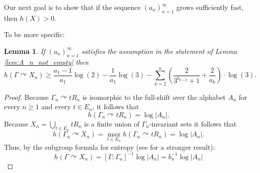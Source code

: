 \documentclass[oneside,english]{amsart}
\newtheorem{lem}[thm]{Lemma}
\theoremstyle{definition}
\newcommand{\act}[2]{{#1} \curvearrowright {#2}}
\begin{document}
Our next goal is to  show that if the sequence $(a_n)_{n=1}^\infty$ grows sufficiently fast, then $h(X)>0$.

To be more specific:

\begin{lem}\label{lem:h_X_n_lower_bound}
If $(a_n)_{n=1}^\infty$ satisfies the assumption in the statement of Lemma \ref{lem:A_n_not_empty} then
\begin{equation}\label{h_X_n_lower_bound}
 h(\act{\Gamma}{X_n})\ge \frac{a_1-1}{a_1}\log(2)- \frac{1}{a_1}\log(3) - \sum_{k=2}^n \left(\frac{2}{3^{b_{k-2}}+1}+\frac{2}{a_k}\right)\cdot \log(3).
\end{equation}
\end{lem}
\begin{proof}
Because $\act{\Gamma_n}{tR_n}$  is isomorphic to the full-shift over the alphabet $A_n$ for every $n \ge1 $ and every $t \in E_n$,
 it follows %
that
$$h(\act{\Gamma_n}{tR_n}) = \log |A_n|.$$
Because $X_n=  \bigcup_{t \in E_n}t R_n$ is a finite union of $\Gamma_n$-invariant sets it follows that
$$h(\act{\Gamma_n}{X_n}) = \max_{t \in E_n} h(\act{\Gamma_n}{t R_n}) = \log |A_n|.$$
Thus, by the subgroup formula for entropy  (see \cite[Theorem $2.16$]{MR1878075} for a stronger result):
$$h(\act{\Gamma}{X_n})   = [\Gamma:\Gamma_n]^{-1} \log |A_n|= b_n^{-1} \log |A_n|$$


\end{proof}
\end{document}
